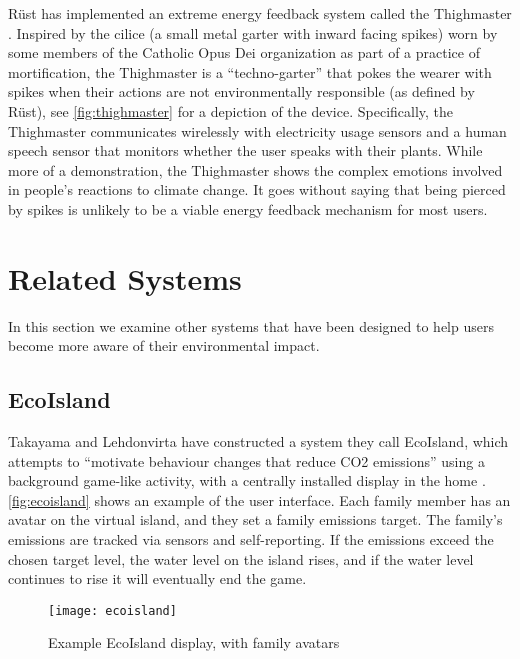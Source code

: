 R\"{u}st has implemented an extreme energy feedback system called the Thighmaster \cite{Rust2008Thighmaster-web}. Inspired by the cilice (a small metal garter with inward facing spikes) worn by some members of the Catholic Opus Dei organization as part of a practice of mortification, the Thighmaster is a ``techno-garter'' that pokes the wearer with spikes when their actions are not environmentally responsible (as defined by R\"{u}st), see \autoref{fig:thighmaster} for a depiction of the device. Specifically, the Thighmaster communicates wirelessly with electricity usage sensors and a human speech sensor that monitors whether the user speaks with their plants. While more of a demonstration, the Thighmaster shows the complex emotions involved in people's reactions to climate change. It goes without saying that being pierced by spikes is unlikely to be a viable energy feedback mechanism for most users.

\section{Related Systems}
\label{sec:related-systems}

In this section we examine other systems that have been designed to help users become more aware of their environmental impact.

\subsection{EcoIsland}
\label{sec:ecoisland}

Takayama and Lehdonvirta have constructed a system they call EcoIsland, which attempts to ``motivate behaviour changes that reduce CO2 emissions'' using a background game-like activity, with a centrally installed display in the home \cite{takayama-2008}. \autoref{fig:ecoisland} shows an example of the user interface. Each family member has an avatar on the virtual island, and they set a family \COtwo emissions target. The family's emissions are tracked via sensors and self-reporting. If the emissions exceed the chosen target level, the water level on the island rises, and if the water level continues to rise it will eventually end the game.

\begin{figure}[htb]
	\centering
		\texttt{[image: ecoisland]}
		\caption{Example EcoIsland display, with family avatars}
		\label{fig:ecoisland}
\end{figure}

